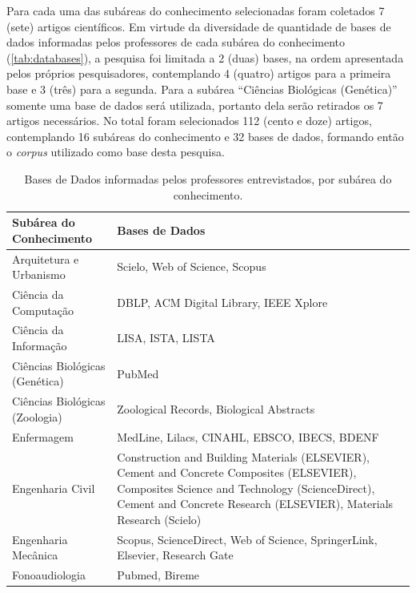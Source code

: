 Para cada uma das subáreas do conhecimento selecionadas foram coletados 7 (sete) artigos científicos. Em virtude da diversidade de quantidade de bases de dados informadas pelos professores de cada subárea do conhecimento (\autoref{tab:databases}), a pesquisa foi limitada a 2 (duas) bases, na ordem apresentada pelos próprios pesquisadores, contemplando 4 (quatro) artigos para a primeira base e 3 (três) para a segunda. Para a subárea ``Ciências Biológicas (Genética)'' somente uma base de dados será utilizada, portanto dela serão retirados os 7 artigos necessários. No total foram selecionados 112 (cento e doze) artigos, contemplando 16 subáreas do conhecimento e 32 bases de dados, formando então o \emph{corpus} utilizado como base desta pesquisa.

\begin{table}
    \caption{Bases de Dados informadas pelos professores entrevistados, por subárea do conhecimento.}
    \begin{center}
        \begin{tabular}{|p{6cm}|p{8cm}|}
            \hline 
            \textbf{Subárea do Conhecimento} & \textbf{Bases de Dados} \\ 
            \hline 
            Arquitetura e Urbanismo & Scielo, Web of Science, Scopus \\
            \hline
            Ciência da Computação & DBLP, ACM Digital Library, IEEE Xplore \\
            \hline
            Ciência da Informação & LISA, ISTA, LISTA \\
            \hline
            Ciências Biológicas (Genética) & PubMed \\
            \hline
            Ciências Biológicas (Zoologia) & Zoological Records, Biological Abstracts \\
            \hline
            Enfermagem & MedLine, Lilacs, CINAHL, EBSCO, IBECS, BDENF \\
            \hline
            Engenharia Civil & Construction and Building Materials (ELSEVIER), Cement and Concrete Composites (ELSEVIER), Composites Science and Technology (ScienceDirect), Cement and Concrete Research (ELSEVIER), Materials Research (Scielo) \\
            \hline
            Engenharia Mecânica & Scopus, ScienceDirect, Web of Science, SpringerLink, Elsevier, Research Gate \\
            \hline
            Fonoaudiologia & Pubmed, Bireme \\
            \hline

\end{tabular}
\end{center}
\end{table}
